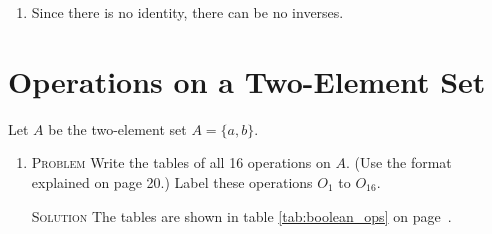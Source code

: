 \documentclass[draft,twoside]{amsart}
\newcommand{\Solution}{\textsc{Solution}\xspace}
\newcommand{\Problem}{\textsc{Problem}\xspace}
\begin{document}
\begin{enumerate}
\begin{enumerate}
      \item Since there is no identity, there can be no inverses.
   \end{enumerate}

\end{enumerate}

\section{Operations on a Two-Element Set}
Let $A$ be the two-element set $A = \{a,b\}$.
\begin{enumerate}
   \item \Problem Write the tables of all 16 operations on $A$. (Use the format
   explained on page 20.) Label these operations $O_1$ to $O_{16}$. 

   \noindent \Solution The tables are shown in table \ref{tab:boolean_ops} on 
   page~\pageref{tab:boolean_ops}.


\end{enumerate}
\end{document}
